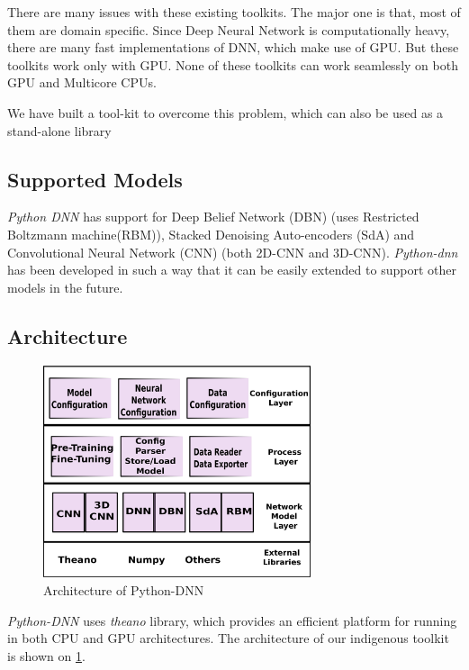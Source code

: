 There are many issues with these existing toolkits. The major one is that, most of them are domain specific. Since Deep Neural Network is computationally heavy, there are many fast implementations of DNN, which make use of GPU. But these toolkits work only with GPU. None of these toolkits can work seamlessly on both GPU and Multicore CPUs. 

We have built a tool-kit to overcome this problem, which can also be used as a stand-alone library


\subsection{Supported Models}
\label{sec:python-dnnModels}
\textit{Python DNN}  has support  for Deep Belief Network (DBN) \cite{hinton2002training} (uses Restricted Boltzmann machine(RBM)), Stacked Denoising Auto-encoders (SdA) \cite{vincent2010stacked} and Convolutional Neural Network (CNN) \cite{lecun1998gradient} (both 2D-CNN and 3D-CNN). \textit{Python-dnn} has been developed in such a way that it can be easily extended to support other models in the future.

\subsection{Architecture}

\begin{figure}[ht]
\centering
\includegraphics[width=0.7\textwidth]{./imgs/Python-DNNArch.eps}
\caption{Architecture of Python-DNN}
\label{fig:pydnn-arch}
\end{figure}

\textit{Python-DNN} uses \emph{theano} library, which provides an efficient platform for running in both CPU and GPU architectures. The architecture of our indigenous toolkit is shown on \ref{fig:pydnn-arch}. 

